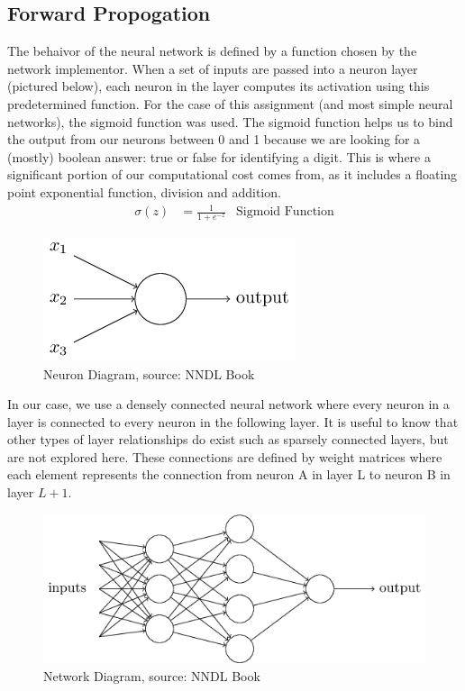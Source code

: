 \documentclass[11pt]{article}
\begin{document}
\subsection{Forward Propogation}
The behaivor of the neural network is defined by a function chosen by the network implementor. When a set of inputs are passed into a neuron layer (pictured below), each neuron in the layer computes its activation using this predetermined function. For the case of this assignment (and most simple neural networks), the sigmoid function was used. The sigmoid function helps us to bind the output from our neurons between 0 and 1 because we are looking for a (mostly) boolean answer: true or false for identifying a digit. This is where a significant portion of our computational cost comes from, as it includes a floating point exponential function, division and addition.
\begin{align}
	\sigma(z) & = \frac{1}{1 + e^{-z}} & \text{Sigmoid Function} 
\end{align}

\begin{figure}[H]
	\centering
	\includegraphics[scale=.5]{nn0.png}
	\caption{Neuron Diagram, source: NNDL Book}
\end{figure}

In our case, we use a densely connected neural network where every neuron in a layer is connected to every neuron in the following layer. It is useful to know that other types of layer relationships do exist such as sparsely connected layers, but are not explored here. These connections are defined by weight matrices where each element represents the connection from neuron A in layer L to neuron B in layer $L+1$.

\begin{figure}[H]
	\centering
	\includegraphics[width=.45\textwidth]{nn1.png}
	\caption{Network Diagram, source: NNDL Book}
\end{figure}
\end{document}
